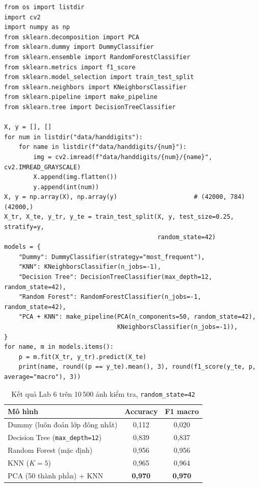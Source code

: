 
\begin{lstlisting}[caption={Lab 6 -- đọc ảnh, chia dữ liệu phân tầng và so sánh các mô hình}]
from os import listdir
import cv2
import numpy as np
from sklearn.decomposition import PCA
from sklearn.dummy import DummyClassifier
from sklearn.ensemble import RandomForestClassifier
from sklearn.metrics import f1_score
from sklearn.model_selection import train_test_split
from sklearn.neighbors import KNeighborsClassifier
from sklearn.pipeline import make_pipeline
from sklearn.tree import DecisionTreeClassifier

X, y = [], []
for num in listdir("data/handdigits"):
    for name in listdir(f"data/handdigits/{num}"):
        img = cv2.imread(f"data/handdigits/{num}/{name}", cv2.IMREAD_GRAYSCALE)
        X.append(img.flatten())
        y.append(int(num))
X, y = np.array(X), np.array(y)                     # (42000, 784) (42000,)
X_tr, X_te, y_tr, y_te = train_test_split(X, y, test_size=0.25, stratify=y,
                                          random_state=42)
models = {
    "Dummy": DummyClassifier(strategy="most_frequent"),
    "KNN": KNeighborsClassifier(n_jobs=-1),
    "Decision Tree": DecisionTreeClassifier(max_depth=12, random_state=42),
    "Random Forest": RandomForestClassifier(n_jobs=-1, random_state=42),
    "PCA + KNN": make_pipeline(PCA(n_components=50, random_state=42),
                               KNeighborsClassifier(n_jobs=-1)),
}
for name, m in models.items():
    p = m.fit(X_tr, y_tr).predict(X_te)
    print(name, round((p == y_te).mean(), 3), round(f1_score(y_te, p, average="macro"), 3))
\end{lstlisting}

\begin{table}[H]
\centering
\begin{tabular}{|l|c|c|}
\hline
\textbf{Mô hình} & \textbf{Accuracy} & \textbf{F1 macro} \\
\hline
Dummy (luôn đoán lớp đông nhất) & 0,112 & 0,020 \\ \hline
Decision Tree (\texttt{max\_depth=12}) & 0,839 & 0,837 \\ \hline
Random Forest (mặc định) & 0,956 & 0,956 \\ \hline
KNN ($K = 5$) & 0,965 & 0,964 \\ \hline
PCA (50 thành phần) + KNN & \textbf{0,970} & \textbf{0,970} \\ \hline
\end{tabular}
\caption{Kết quả Lab 6 trên 10\,500 ảnh kiểm tra, \texttt{random\_state=42}}
\label{tab:lab-digits}
\end{table}

